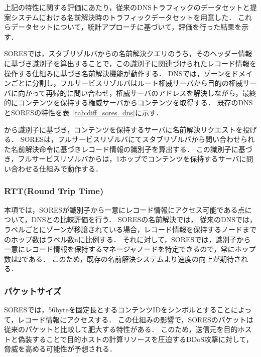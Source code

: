 上記の特性に関する評価にあたり，従来のDNSトラフィックのデータセットと提案システムにおける名前解決時のトラフィックデータセットを用意した．
これらデータセットについて，統計アプローチに基づいて，評価を行った結果を示す．


SORESでは，スタブリゾルバからの名前解決クエリのうち，そのヘッダー情報に基づき識別子を算出することで，この識別子に関連づけられたレコード情報を操作する仕組みに基づき名前解決機能が動作する．
DNSでは，ゾーンをドメインごとに分割し，フルサービスリゾルバはルート権威サーバから目的の権威サーバに向かって再帰的に問い合わせ，権威サーバのアドレスを解決しながら，最終的にコンテンツを保持する権威サーバからコンテンツを取得する．
既存のDNSとSORESの特性を表~\ref{tab:diff_sores_dns}に示す．


から識別子に基づき，コンテンツを保持するサーバに名前解決リクエストを投げる．
SORESは，フルサービスリゾルバにてスタブリゾルバから問い合わせられた名前解決命令に基づきレコード情報の識別子を算出する．
この識別子に基づき，フルサービスリゾルバからは，1ホップでコンテンツを保持するサーバに問い合わせる仕組みで動作する．
\subsubsection{RTT(Round Trip Time)}
本項では，SORESが識別子から一意にレコード情報にアクセス可能である点について，DNSとの比較評価を行う．
SORESの名前解決では，
従来のDNSでは，ラベルごとにゾーンが移譲されている場合，レコード情報を保持するノードまでのホップ数はラベル数nに比例する．
それに対して，SORESでは，識別子から一意にレコード情報を保持するマネージャノードを特定できるので，常にホップ数は2である．
このため，既存の名前解決システムより速度の向上が期待される．
\subsubsection{パケットサイズ}
SORESでは，56byteを固定長とするコンテンツIDをシンボルとすることによって，レコード情報にアクセスする．
この仕組みの影響で，SORESのパケットは従来のパケットと比較して肥大する特性がある．
このため，送信元を目的ホストと偽装することで目的ホストの計算リソースを圧迫するDDoS攻撃に対して，脅威を高める可能性が予想される．
